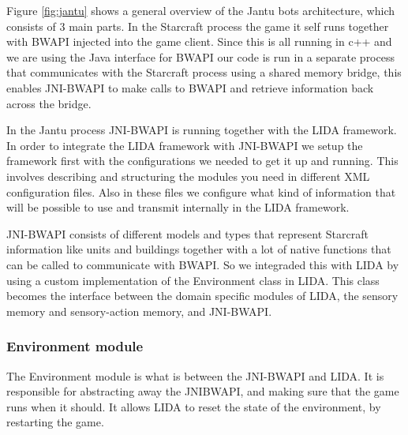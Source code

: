 Figure \ref{fig:jantu} shows a general overview of the Jantu bots architecture, which consists of 3 main parts. In the Starcraft process the game it self runs together with BWAPI injected into the game client. Since this is all running in c++ and we are using the Java interface for BWAPI our code is run in a separate process that communicates with the Starcraft process using a shared memory bridge, this enables JNI-BWAPI to make calls to BWAPI and retrieve information back across the bridge. 

In the Jantu process JNI-BWAPI is running together with the LIDA framework. In order to integrate the LIDA framework with JNI-BWAPI we setup the framework first with the configurations we needed to get it up and running. This involves describing and structuring the modules you need in different XML configuration files. Also in these files we configure what kind of information that will be possible to use and transmit internally in the LIDA framework. 

JNI-BWAPI consists of different models and types that represent Starcraft information like units and buildings together with a lot of native functions that can be called to communicate with BWAPI. So we integraded this with LIDA by using a custom implementation of the Environment class in LIDA. This class becomes the interface between the domain specific modules of LIDA, the sensory memory and sensory-action memory, and JNI-BWAPI. 


\subsubsection{Environment module}
The Environment module is what is between the JNI-BWAPI and LIDA. It is responsible for abstracting away the JNIBWAPI, and making sure that the game runs when it should. It allows LIDA to reset the state of the environment, by restarting the game.
